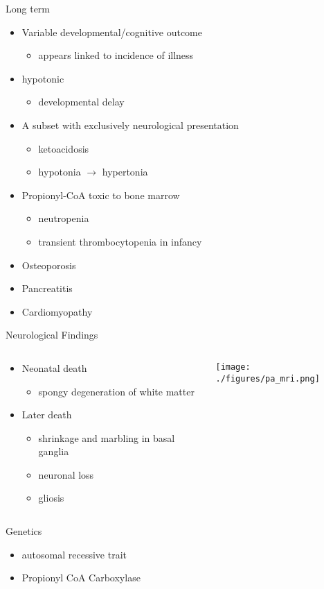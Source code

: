 \documentclass[presentation, smaller]{beamer}
\begin{document}
\begin{frame}[label={sec:orgheadline10}]{Long term}
\begin{itemize}
\item Variable developmental/cognitive outcome
\begin{itemize}
\item appears linked to incidence of illness
\end{itemize}
\item hypotonic
\begin{itemize}
\item developmental delay
\end{itemize}
\item A subset with exclusively neurological presentation
\begin{itemize}
\item \textpm{} ketoacidosis
\item hypotonia \(\to\) hypertonia
\end{itemize}
\item Propionyl-CoA toxic to bone marrow
\begin{itemize}
\item neutropenia
\item transient thrombocytopenia in infancy
\end{itemize}
\item Osteoporosis
\item Pancreatitis
\item Cardiomyopathy
\end{itemize}
\end{frame}


\begin{frame}[label={sec:orgheadline11}]{Neurological Findings}
\begin{columns}
\begin{column}{.5\columnwidth}
\begin{itemize}
\item Neonatal death
\begin{itemize}
\item spongy degeneration of white matter
\end{itemize}
\item Later death
\begin{itemize}
\item shrinkage and marbling in basal ganglia
\item neuronal loss
\item gliosis
\end{itemize}
\end{itemize}
\end{column}
\begin{column}{.5\columnwidth}
\texttt{[image: ./figures/pa\_mri.png]}
\end{column}
\end{columns}
\end{frame}





\begin{frame}[label={sec:orgheadline12}]{Genetics}
\begin{itemize}
\item autosomal recessive trait
\item Propionyl CoA Carboxylase
\end{itemize}
\end{frame}
\end{document}
